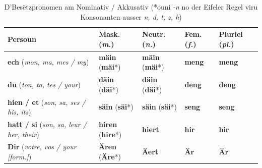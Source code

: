 \begin{table}[htbp]
    \centering
    \small
    \begin{tabular}{lllll}
        \toprule
        \textbf{Persoun} & \textbf{Mask. (\textit{m.})} & \textbf{Neutr. (\textit{n.})} & \textbf{Fem. (\textit{f.})} & \textbf{Pluriel (\textit{pl.})} \\
        \midrule
        \textbf{ech} (\textit{mon, ma, mes / my}) & \textbf{mäin} (\textbf{mäi}*) & \textbf{mäin} (\textbf{mäi}*) & \textbf{meng} & \textbf{meng} \\
        \textbf{du} (\textit{ton, ta, tes / your}) & \textbf{däin} (\textbf{däi}*) & \textbf{däin} (\textbf{däi}*) & \textbf{deng} & \textbf{deng} \\
        \textbf{hien / et} (\textit{son, sa, ses / his, its}) & \textbf{säin} (\textbf{säi}*) & \textbf{säin} (\textbf{säi}*) & \textbf{seng} & \textbf{seng} \\
        \textbf{hatt / si} (\textit{son, sa, leur / her, their}) & \textbf{hiren} (\textbf{hire}*) & \textbf{hiert} & \textbf{hir} & \textbf{hir} \\
        \textbf{Dir} (\textit{votre, vos / your [form.]}) & \textbf{Ären} (\textbf{Äre}*) & \textbf{Äert} & \textbf{Är} & \textbf{Är} \\
        \bottomrule
    \end{tabular}
    \caption{D'Besëtzpronomen am Nominativ / Akkusativ (*ouni \textit{-n} no der Eifeler Regel viru Konsonanten ausser \textit{n, d, t, z, h})}
\end{table}

